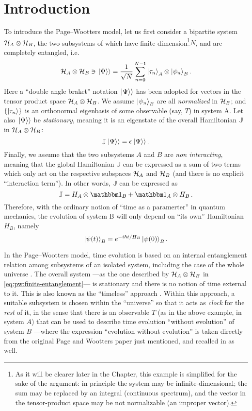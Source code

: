 \section{Introduction}

To introduce the Page--Wootters model, let us first consider
a bipartite system $\mathcal{H}_A \otimes \mathcal{H}_B$,
the two subsystems of which have finite dimension\footnote{
  As it will be clearer later in the Chapter,
  this example is simplified for the sake of the argument: in principle
  the system may be infinite-dimensional;
  the sum may be replaced by an integral (continuous spectrum),
  and the vector in the tensor-product space may be not normalizable (an improper vector).
}$N$,
and are completely
entangled, i.e.
\begin{equation}\label{eq:pw:finite-entanglement}
  \mathcal{H}_A \otimes \mathcal{H}_B \ni \left.\left| \Psi \right\rangle\right\rangle
  =
  \frac{1}{\sqrt{N}} \sum_{n=0}^{N-1} \ket{\tau_{n}}_{A} \otimes \ket{\psi_{n}}_{B} \text{.}
\end{equation}
Here
a ``double angle braket'' notation $\left.\left| \Psi \right\rangle\right\rangle$ has been adopted
for vectors in the tensor product space $\mathcal{H}_A \otimes \mathcal{H}_B$.
We assume $\ket{\psi_{n}}_{B}$ are all \emph{normalized} in $\mathcal{H}_B$;
and
$\qty{\ket{{\tau}_n}}$ is an orthonormal eigenbasis of some observable (say, $T$) in system A.
Let also $\left.\left| \Psi \right\rangle\right\rangle$ be \emph{stationary}, meaning it is an eigenstate
of the overall Hamiltonian $\mathbb{J}$ in $\mathcal{H}_A \otimes \mathcal{H}_B$:
$$
  \mathbb{J} \left.\left| \Psi \right\rangle\right\rangle = \epsilon \left.\left| \Psi \right\rangle\right\rangle \text{.}
$$
Finally, we assume that the two subsystems $A$ and $B$ are \emph{non interacting},
meaning that the global Hamiltonian $\mathbb{J}$ can be expressed as a sum of two terms
which only act on the respective subspaces $\mathcal{H}_A$ and $\mathcal{H}_B$
(and there is no explicit ``interaction term''). In other words,
$\mathbb{J}$ can be expressed as
$$
  \mathbb{J} = H_A \ox \idop_B + \idop_A \ox H_B \, \text{.} 
$$
Therefore, with the ordinary notion of ``time as a paramerter'' in quantum mechanics,
the evolution of system B will only depend on ``its own'' Hamiltonian $H_B$, namely
\begin{equation}\label{eq:pw:ordinary_B}
  \ket{\psi(t)}_B = e^{- i \hbar t / H_B } \ket{\psi(0)}_B \text{.}  
\end{equation}
 
In the Page--Wootters model, time evolution is based on an internal entanglement
relation among subsystems of an isolated system,
including the case of the whole universe \parencite{PageWootters}.
The overall system
---as the one described by $\mathcal{H}_A \otimes \mathcal{H}_B$ in \eqref{eq:pw:finite-entanglement}---
is stationary and there is no notion
of time external to it.
This is also known as the
``timeless'' approach \parencite{Marletto:Evolution}.
\citereset
Within this approach,
a suitable subsystem is chosen within the ``universe'' so that it acts as
\emph{clock} for the \emph{rest} of it, in the sense that
there is an observable $T$ (as in the above example, in system $A$)
that can be used to
describe time evolution ``without evolution'' of system $B$
---where the expression ``evolution without evolution''
is taken directly from the original Page and Wootters paper just mentioned,
and recalled in \cite{Marletto:Evolution} as well.

